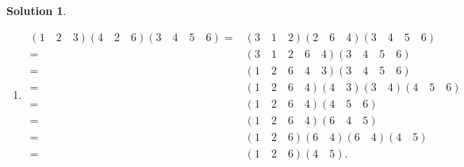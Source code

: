 \documentclass[UTF8,10pt,a4paper]{article}
\theoremstyle{Problem}
\theoremstyle{Solution}
\newtheorem*{sol}{Solution}
\begin{document}
\begin{sol}
\begin{enumerate}
\begin{align}
            \nonumber=&(5\quad 1\quad 2)(2\quad 4)(2\quad 4\quad 3)(2\quad 6)\\
            \nonumber=&(5\quad 1\quad 2)(2\quad 4)(2\quad 4)(4\quad 3)(2\quad 6)\\
            \nonumber=&(5\quad 1\quad 2)(4\quad 3)(2\quad 6)=(5\quad 1\quad 2)(2\quad 6)(4\quad 3)\\
            =&(5\quad 1\quad 2\quad 6)(4\quad 3).
        \end{align}
        \item[(e)]
        \begin{align}
            \nonumber(1\quad 2\quad 3)(4\quad 2\quad 6)(3\quad 4\quad 5\quad 6)=&(3\quad 1\quad 2)(2\quad 6\quad 4)(3\quad 4\quad 5\quad 6)\\
            \nonumber=&(3\quad 1\quad 2\quad 6\quad 4)(3\quad 4\quad 5\quad 6)\\
            \nonumber=&(1\quad 2\quad 6\quad 4\quad 3)(3\quad 4\quad 5\quad 6)\\
            \nonumber=&(1\quad 2\quad 6\quad 4)(4\quad 3)(3\quad 4)(4\quad 5\quad 6)\\
            \nonumber=&(1\quad 2\quad 6\quad 4)(4\quad 5\quad 6)\\
            \nonumber=&(1\quad 2\quad 6\quad 4)(6\quad 4\quad 5)\\
            \nonumber=&(1\quad 2\quad 6)(6\quad 4)(6\quad 4)(4\quad 5)\\
            =&(1\quad 2\quad 6)(4\quad 5).
        \end{align}
    \end{enumerate}
\end{sol}
\end{document}
